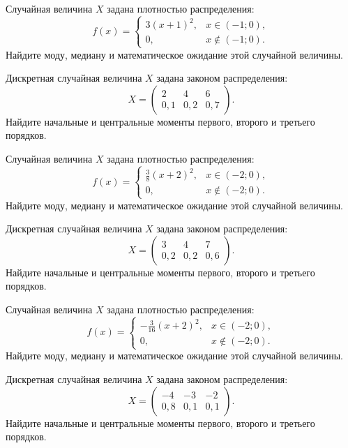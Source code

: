 \vfill

\newpage\setcounter{zad}{0}

\z Случайная величина $X$ задана плотностью распределения: $$f(x) = \begin{cases} 3(x+1)^2, & x \in (-1; 0), \\ 0, & x \not\in (-1; 0). \end{cases}$$ Найдите моду, медиану и математическое ожидание этой случайной величины.


\vfill

\z Дискретная случайная величина $X$ задана законом распределения: $$ X = \left(\begin{array}{rrr}2 & 4 & 6\\0{,}1 & 0{,}2 & 0{,}7\end{array}\right).$$ Найдите начальные и центральные моменты первого, второго и третьего порядков.
 

\vfill

\newpage\setcounter{zad}{0}

\z Случайная величина $X$ задана плотностью распределения: $$f(x) = \begin{cases} \frac{3}{8}(x+2)^2, & x \in (-2; 0), \\ 0, & x \not\in (-2; 0). \end{cases}$$ Найдите моду, медиану и математическое ожидание этой случайной величины.


\vfill

\z Дискретная случайная величина $X$ задана законом распределения: $$ X = \left(\begin{array}{rrr}3 & 4 & 7\\0{,}2 & 0{,}2 & 0{,}6\end{array}\right).$$ Найдите начальные и центральные моменты первого, второго и третьего порядков.
 

\vfill

\newpage\setcounter{zad}{0}

\z Случайная величина $X$ задана плотностью распределения: $$f(x) = \begin{cases} -\frac{3}{16}(x+2)^2, & x \in (-2; 0), \\ 0, & x \not\in (-2; 0). \end{cases}$$ Найдите моду, медиану и математическое ожидание этой случайной величины.


\vfill

\z Дискретная случайная величина $X$ задана законом распределения: $$ X = \left(\begin{array}{rrr}-4 & -3 & -2\\0{,}8 & 0{,}1 & 0{,}1\end{array}\right).$$ Найдите начальные и центральные моменты первого, второго и третьего порядков.
 

